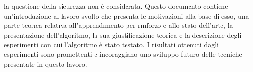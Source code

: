 la questione della sicurezza non è considerata. Questo documento contiene un'introduzione al lavoro svolto che presenta le motivazioni alla base di esso, una parte teorica relativa all'apprendimento per rinforzo e allo stato dell'arte, la presentazione dell'algoritmo, la sua giustificazione teorica e la descrizione degli esperimenti con cui l'algoritmo è stato testato. I risultati ottenuti dagli esperimenti sono promettenti e incoraggiano uno sviluppo futuro delle tecniche presentate in questo lavoro.

\endgroup